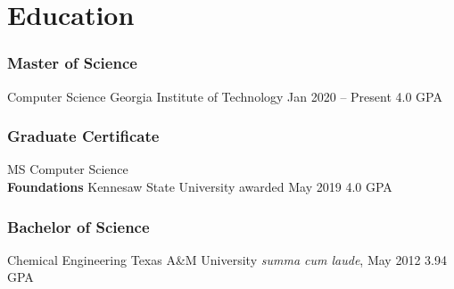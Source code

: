 %
%
%
%
\section{Education}
  \subsubsection{Master of Science} 
  \school%
    {Computer Science}%
    {Georgia Institute of Technology}%
    {Jan 2020 -- Present}%
    {4.0 GPA}
%
%
  {\vspace{-1em}}
%
%
  \subsubsection{Graduate Certificate}
  \school%
    {MS Computer Science \\ \bf{Foundations}}%
    {Kennesaw State University}%
    {awarded May 2019}%
    {4.0 GPA}
%
%
  {\vspace{-1em}}
%
%
  \subsubsection{Bachelor of Science}
  \school%
    {Chemical Engineering}%
    {Texas A\&M University}%
    {\textit{summa cum laude}, May 2012}%
    {3.94 GPA}
%
%
%